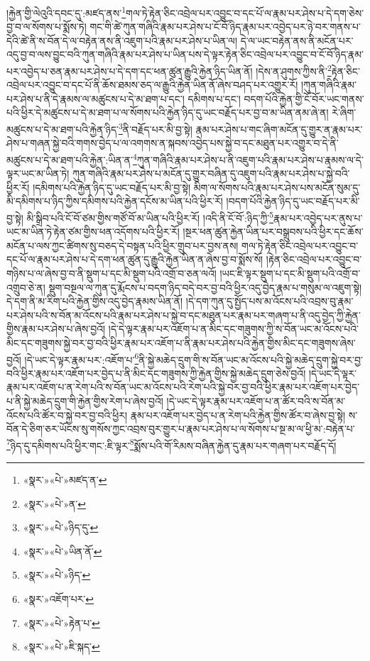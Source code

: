 །རྐྱེན་གྱི་ལེའུའི་དབང་དུ་:མཛད་ནས་\footnote{«སྣར་»«པེ་»མཛད་ན་}གལ་ཏེ་རྟེན་ཅིང་འབྲེལ་པར་འབྱུང་བ་དང་པོ་ལ་རྣམ་པར་ཤེས་པ་དེ་དག་ཅེས་བྱ་བ་ལ་སོགས་པ་སྨོས་ཏེ། གང་གི་ཚེ་ཀུན་གཞིའི་རྣམ་པར་ཤེས་པ་ངོ་བོ་ཉིད་རྣམ་པར་འབྱེད་པར་ཉེ་བར་གནས་པ་དེའི་ཚེ་ནི་ས་བོན་དེ་ལ་བརྟེན་ནས་ནི་འཇུག་པའི་རྣམ་པར་ཤེས་པ་ཡིན་ལ། དེ་ལ་ཡང་བརྟེན་ནས་ནི་མངོན་པར་འདུ་བྱ་བ་ལས་བྱུང་བའི་ཀུན་གཞིའི་རྣམ་པར་ཤེས་པ་ཡིན་པས་དེ་ལྟར་རྟེན་ཅིང་འབྲེལ་པར་འབྱུང་བ་ངོ་བོ་ཉིད་རྣམ་པར་འབྱེད་པ་ཅན་རྣམ་པར་ཤེས་པ་དེ་དག་དང་ཕན་ཚུན་རྒྱུའི་རྐྱེན་ཉིད་ཡིན་ནོ། །དེས་ན་ཤུགས་ཀྱིས་ནི་\footnote{«སྣར་»«པེ་»ན་}རྟེན་ཅིང་འབྲེལ་པར་འབྱུང་བ་དང་པོ་ནི་ཆོས་ཐམས་ཅད་ལ་རྒྱུའི་རྐྱེན་ཡིན་ནོ་ཞེས་བཤད་པར་འགྱུར་རོ། །ཀུན་གཞིའི་རྣམ་པར་ཤེས་པ་ནི་དེ་རྣམས་ལ་མཚུངས་པ་དེ་མ་ཐག་པ་དང་། དམིགས་པ་དང་། བདག་པོའི་རྐྱེན་གྱི་ངོ་བོར་ཡང་གནས་པའི་ཕྱིར་དེ་མཚུངས་པ་དེ་མ་ཐག་པ་ལ་སོགས་པའི་རྐྱེན་ཉིད་དུ་ཡང་བརྗོད་པར་བྱ་བ་མ་ཡིན་ནམ་ཞེ་ན། རེ་ཞིག་མཚུངས་པ་དེ་མ་ཐག་པའི་རྐྱེན་ཉིད་\footnote{«སྣར་»«པེ་»ཉིད་དུ་}ནི་བརྗོད་པར་མི་བྱ་སྟེ། རྣམ་པར་ཤེས་པ་གང་ཞིག་མངོན་དུ་གྱུར་ན་རྣམ་པར་ཤེས་པ་གཞན་སྐྱེ་བའི་གགས་བྱེད་པ་ལ་འགགས་ན་སྐབས་འབྱེད་པས་སྐྱེ་བ་དང་མཐུན་པར་འགྱུར་བ་དེ་ནི་མཚུངས་པ་དེ་མ་ཐག་པའི་རྐྱེན་:ཡིན་ན་\footnote{«སྣར་»«པེ་»ཡིན་ནོ་}ཀུན་གཞིའི་རྣམ་པར་ཤེས་པ་ནི་འཇུག་པའི་རྣམ་པར་ཤེས་པ་རྣམས་ལ་དེ་ལྟར་ཡང་མ་ཡིན་ཏེ། ཀུན་གཞིའི་རྣམ་པར་ཤེས་པ་མངོན་དུ་གྱུར་བཞིན་དུ་འཇུག་པའི་རྣམ་པར་ཤེས་པ་སྐྱེ་བའི་ཕྱིར་རོ། །དམིགས་པའི་རྐྱེན་ཉིད་དུ་ཡང་བརྗོད་པར་མི་བྱ་སྟེ། མིག་ལ་སོགས་པའི་རྣམ་པར་ཤེས་པས་མངོན་སུམ་དུ་མི་དམིགས་པ་ཉིད་ཀྱིས་དམིགས་པའི་རྐྱེན་དངོས་མ་ཡིན་པའི་ཕྱིར་རོ། །བདག་པོའི་རྐྱེན་ཉིད་དུ་ཡང་བརྗོད་པར་མི་བྱ་སྟེ། མི་སྒྲིབ་པའི་ངོ་བོ་ཙམ་གྱིས་གཙོ་བོ་མ་ཡིན་པའི་ཕྱིར་རོ། །འདི་ནི་ངོ་བོ་:ཉིད་ཀྱི་\footnote{«སྣར་»«པེ་»ཉིད་}རྣམ་པར་འབྱེད་པར་ནུས་པ་ཡང་མ་ཡིན་ཏེ་རྟེན་ཙམ་གྱིས་ཕན་འདོགས་པའི་ཕྱིར་རོ། །སྔར་ཕན་ཚུན་རྐྱེན་ཡིན་པར་བསྒྲུབས་པའི་ཕྱིར་དང་ཆོས་མངོན་པ་ལས་ཀྱང་ཚིགས་སུ་བཅད་དེ་བསྟན་པའི་ཕྱིར་གྲུབ་པར་བྱས་ནས། གལ་ཏེ་རྟེན་ཅིང་འབྲེལ་པར་འབྱུང་བ་དང་པོ་ལ་རྣམ་པར་ཤེས་པ་དེ་དག་ཕན་ཚུན་དུ་རྒྱུའི་རྐྱེན་ཡིན་ན་ཞེས་བྱ་བ་སྨོས་སོ། །རྟེན་ཅིང་འབྲེལ་པར་འབྱུང་བ་གཉིས་པ་ལ་ཞེས་བྱ་བ་ནི་སྡུག་པ་དང་མི་སྡུག་པའི་འགྲོ་བ་ཅན་ལའོ། །ཡང་ཇི་ལྟར་སྡུག་པ་དང་མི་སྡུག་པའི་འགྲོ་བ་འགྲུབ་ཅེ་ན། སྡུག་བསྔལ་ལ་ཀུན་དུ་རྨོངས་པ་བདག་ཉིད་བདེ་བར་བྱ་བའི་ཕྱིར་འདུ་བྱེད་རྣམ་པ་གསུམ་ལ་འཇུག་སྟེ། དེ་དག་ནི་མ་རིག་པའི་རྐྱེན་གྱིས་འདུ་བྱེད་རྣམས་ཡིན་ནོ། །དེ་དག་ཀུན་དུ་སྤྱོད་པས་མ་འོངས་པའི་འབྲས་བུ་རྣམ་པར་ཤེས་པའི་ས་བོན་མ་འོངས་པའི་རྣམ་པར་ཤེས་པ་སྐྱེ་བ་དང་མཐུན་པར་རྣམ་པར་གཞག་པ་ནི་འདུ་བྱེད་ཀྱི་རྐྱེན་གྱིས་རྣམ་པར་ཤེས་པ་ཞེས་བྱའོ། །དེ་དེ་ལྟར་རྣམ་པར་འཇོག་པ་ན་མིང་དང་གཟུགས་ཀྱི་ས་བོན་ཡང་མ་འོངས་པའི་མིང་དང་གཟུགས་སྐྱེ་བར་བྱ་བའི་ཕྱིར་རྣམ་པར་འཇོག་པ་ནི་རྣམ་པར་ཤེས་པའི་རྐྱེན་གྱིས་མིང་དང་གཟུགས་ཞེས་བྱའོ། །དེ་ཡང་དེ་ལྟར་རྣམ་པར་:འཇོག་པ་\footnote{«སྣར་»འཇོག་པར་}ནི་སྐྱེ་མཆེད་དྲུག་གི་ས་བོན་ཡང་མ་འོངས་པའི་སྐྱེ་མཆེད་དྲུག་སྐྱེ་བར་བྱ་བའི་ཕྱིར་རྣམ་པར་འཇོག་པར་བྱེད་པ་ནི་མིང་དང་གཟུགས་ཀྱི་རྐྱེན་གྱིས་སྐྱེ་མཆེད་དྲུག་ཅེས་བྱའོ། །དེ་ཡང་དེ་ལྟར་རྣམ་པར་འཇོག་པ་ན་རེག་པའི་ས་བོན་ཡང་མ་འོངས་པའི་རེག་པའི་སྐྱེ་བར་བྱ་བའི་ཕྱིར་རྣམ་པར་འཇོག་པར་བྱེད་པ་ནི་སྐྱེ་མཆེད་དྲུག་གི་རྐྱེན་གྱིས་རེག་པ་ཞེས་བྱའོ། །དེ་ཡང་དེ་ལྟར་རྣམ་པར་འཇོག་པ་ན་ཚོར་བའི་ས་བོན་མ་འོངས་པའི་ཚོར་བ་སྐྱེ་བར་བྱ་བའི་ཕྱིར། རྣམ་པར་འཇོག་པར་བྱེད་པ་ན་རེག་པའི་རྐྱེན་གྱིས་ཚོར་བ་ཞེས་བྱ་སྟེ། ས་བོན་དེ་ཅིག་ཅར་ཡོངས་སུ་གསོས་ཀྱང་འབྲས་བུར་གྱུར་པ་རྣམ་པར་ཤེས་པ་ལ་སོགས་པ་སྔ་མ་ལ་ཕྱི་མ་:བརྟེན་པ་\footnote{«སྣར་»«པེ་»རྟེན་པ་}ཉིད་དུ་དམིགས་པའི་ཕྱིར་གང་:ཇི་ལྟར་\footnote{«སྣར་»«པེ་»ཇི་སྐད་}སྨོས་པའི་གོ་རིམས་བཞིན་རྐྱེན་དུ་རྣམ་པར་གཞག་པར་བརྗོད་དོ། 